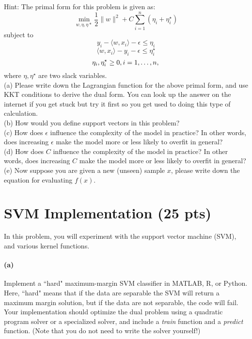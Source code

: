 \documentclass[11pt]{article}
\begin{document}
\noindent Hint:
The primal form for this problem is given as:
\[ \min_{w,\eta,\eta{*}} \frac{1}{2}\|w\|^2+C\sum_{i=1}^{n}(\eta_i+\eta_i^{\star})\] subject to 
 $$y_i-\langle w,x_i \rangle-\epsilon\leq \eta_i$$ $$\langle w,x_i \rangle -y_i-\epsilon\leq \eta_i^{\star}$$ $$\eta_i,\eta_i^{\star}\geq 0, i=1,\dots,n,{\tiny }$$ where $\eta,\eta^{\star}$ are two slack variables.\\


\noindent (a) Please write down the Lagrangian function for the above primal form, and use KKT conditions to derive the dual form. You can look up the answer on the internet if you get stuck but try it first so you get used to doing this type of calculation.\\

\noindent (b) How would you define support vectors in this problem?\\

\noindent (c) How does $\epsilon$ influence the complexity of the model in practice? In other words, does increasing $\epsilon$ make the model more or less likely to overfit in general? \\

\noindent (d) How does $C$ influence the complexity of the model in practice? In other words, does increasing $C$ make the model more or less likely to overfit in general? \\

\noindent (e) Now suppose you are given a new (unseen) sample $x$, please write down the equation for evaluating $f(x)$. 




\section{SVM Implementation (25 pts)}
In this problem, you will experiment with the support vector machine (SVM), and various kernel functions.

\paragraph{(a)} Implement a ``hard" maximum-margin SVM classifier in MATLAB, R, or Python. Here, ``hard" means that if the data are separable the SVM will return a maximum margin solution, but if the data are not separable, the code will fail. Your implementation should optimize the dual problem using a quadratic program solver or a specialized solver, and include a \textit{train} function and a \textit{predict} function. (Note that you do not need to write the solver yourself!)
\end{document}
